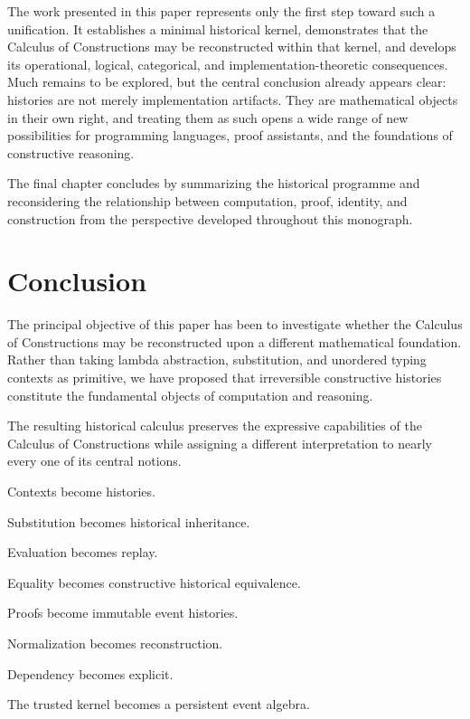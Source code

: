 \documentclass[12pt,oneside]{article}
\theoremstyle{definition}
\theoremstyle{remark}
\begin{document}
The work presented in this paper represents only the first step toward such a
unification. It establishes a minimal historical kernel, demonstrates that the
Calculus of Constructions may be reconstructed within that kernel, and develops
its operational, logical, categorical, and implementation-theoretic
consequences. Much remains to be explored, but the central conclusion already
appears clear: histories are not merely implementation artifacts. They are
mathematical objects in their own right, and treating them as such opens a wide
range of new possibilities for programming languages, proof assistants, and the
foundations of constructive reasoning.

The final chapter concludes by summarizing the historical programme and
reconsidering the relationship between computation, proof, identity, and
construction from the perspective developed throughout this monograph.

\section{Conclusion}

The principal objective of this paper has been to investigate whether the
Calculus of Constructions may be reconstructed upon a different mathematical
foundation. Rather than taking lambda abstraction, substitution, and unordered
typing contexts as primitive, we have proposed that irreversible constructive
histories constitute the fundamental objects of computation and reasoning.

The resulting historical calculus preserves the expressive capabilities of the
Calculus of Constructions while assigning a different interpretation to nearly
every one of its central notions.

Contexts become histories.

Substitution becomes historical inheritance.

Evaluation becomes replay.

Equality becomes constructive historical equivalence.

Proofs become immutable event histories.

Normalization becomes reconstruction.

Dependency becomes explicit.

The trusted kernel becomes a persistent event algebra.
\end{document}
